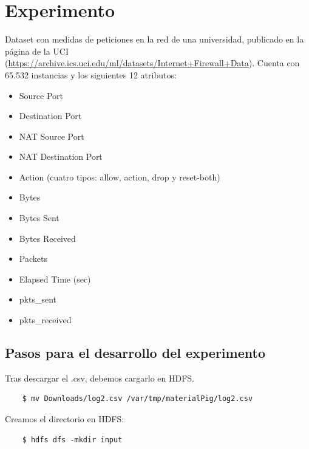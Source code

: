 \documentclass[13pt,a4paper]{article}
\begin{document}
    
    
    \newpage


\section{Experimento}

Dataset con medidas de peticiones en la red de una universidad, publicado en la página de la UCI (\url{https://archive.ics.uci.edu/ml/datasets/Internet+Firewall+Data}). Cuenta con 65.532 instancias y los siguientes 12 atributos:
\begin{itemize}
    \item Source Port
    \item Destination Port
    \item NAT Source Port
    \item NAT Destination Port
    \item Action (cuatro tipos: allow, action, drop y reset-both)
    \item Bytes
    \item Bytes Sent
    \item Bytes Received
    \item Packets
    \item Elapsed Time (sec)
    \item pkts\_sent
    \item pkts\_received
\end{itemize}

\subsection{Pasos para el desarrollo del experimento}

Tras descargar el .csv, debemos cargarlo en HDFS.
\begin{lstlisting}    
    $ mv Downloads/log2.csv /var/tmp/materialPig/log2.csv
\end{lstlisting}

\vspace{\baselineskip}

Creamos el directorio en HDFS:
\begin{lstlisting}
    $ hdfs dfs -mkdir input
\end{lstlisting}

\vspace{\baselineskip}
\end{document}
